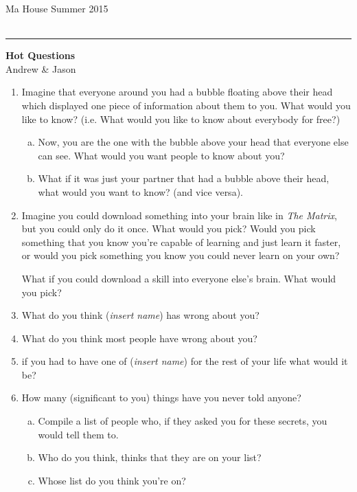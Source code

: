 \documentclass[11pt]{article}
\newcommand{\myheader}[4]{%
	\vspace*{-0.5in}
	\noindent
	{#1} \hfill {#3}\\
	{#2} \hfill {#4}\\
	\rule[8pt]{\textwidth}{1pt}
}
\newcommand{\mytitle}[2]{%
	\begin{center}
		{\large {\bf #1}}\\
		\bigskip
		#2\\ %
		\medskip
	\end{center}
}
\begin{document}
\myheader{Ma House}{}{Summer 2015}{}
\mytitle{Hot Questions}{Andrew \& Jason}

\begin{enumerate}
	\item Imagine that everyone around you had a bubble floating above their head which displayed one piece of information about
		them to you. What would you like to know? (i.e. What would you like to know about everybody for free?)
		\begin{enumerate}[(a)]
			\item Now, you are the one with the bubble above your head that everyone else can see. What would you want people to know
				about you?
			\item What if it was just your partner that had a bubble above their head, what would you want to know? (and vice versa).
		\end{enumerate}
	\item Imagine you could download something into your brain like in \emph{The Matrix}, but you could
		only do it once.  What would you pick?  Would you pick something that you know you're capable 
		of learning and just learn it faster, or would you pick something you know you could never learn
		on your own?

		What if you could download a skill into everyone else's brain.  What would you pick?

	\item What do you think (\emph{insert name}) has wrong about you?
	\item What do you think most people have wrong about you?
	\item if you had to have one of (\emph{insert name}) for the rest of your life what would it be?

	\item How many (significant to you) things have you never told anyone?
		\begin{enumerate}[(a)]
			\item Compile a list of people who, if they asked you for these secrets, you would tell them to.
			\item Who do you think, thinks that they are on your list?
			\item Whose list do you think you're on?
		\end{enumerate}


\end{enumerate}
\end{document}
